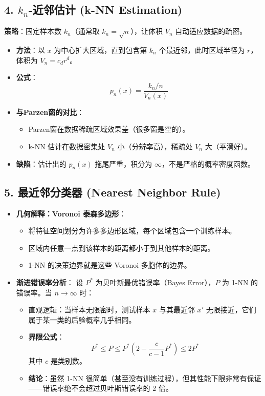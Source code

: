 \documentclass[a4paper, 11pt]{ctexart}
\begin{document}
\subsection{4. $k_n$-近邻估计 (k-NN Estimation)}
\textbf{策略}：固定样本数 $k_n$（通常取 $k_n = \sqrt{n}$），让体积 $V_n$ 自动适应数据的疏密。

\begin{itemize}
    \item \textbf{方法}：以 $x$ 为中心扩大区域，直到包含第 $k_n$ 个最近邻，此时区域半径为 $r$，体积为 $V_n = c_d r^d$。
    \item \textbf{公式}：
    \begin{equation}
        p_n(x) = \frac{k_n/n}{V_n(x)}
    \end{equation}
    \item \textbf{与Parzen窗的对比}：
    \begin{itemize}
        \item Parzen窗在数据稀疏区域效果差（很多窗是空的）。
        \item k-NN 估计在数据密集处 $V_n$ 小（分辨率高），稀疏处 $V_n$ 大（平滑好）。
    \end{itemize}
    \item \textbf{缺陷}：估计出的 $p_n(x)$ 拖尾严重，积分为 $\infty$，不是严格的概率密度函数。
\end{itemize}

\subsection{5. 最近邻分类器 (Nearest Neighbor Rule)}
\begin{itemize}
    \item \textbf{几何解释：Voronoi 泰森多边形}：
    \begin{itemize}
        \item 将特征空间划分为许多多边形区域，每个区域包含一个训练样本。
        \item 区域内任意一点到该样本的距离都小于到其他样本的距离。
        \item 1-NN 的决策边界就是这些 Voronoi 多胞体的边界。
    \end{itemize}

    \item \textbf{渐进错误率分析}：
    设 $P^*$ 为贝叶斯最优错误率（Bayes Error），$P$ 为 1-NN 的错误率。当 $n \to \infty$ 时：
    \begin{itemize}
        \item 直观逻辑：当样本无限密时，测试样本 $x$ 与其最近邻 $x'$ 无限接近，它们属于某一类的后验概率几乎相同。
        \item \textbf{界限公式}：
        \begin{equation}
            P^* \le P \le P^*(2 - \frac{c}{c-1}P^*) \le 2P^*
        \end{equation}
        其中 $c$ 是类别数。
        \item \textbf{结论}：虽然 1-NN 很简单（甚至没有训练过程），但其性能下限非常有保证——错误率绝不会超过贝叶斯错误率的 2 倍。
    \end{itemize}
\end{itemize}
\end{document}
